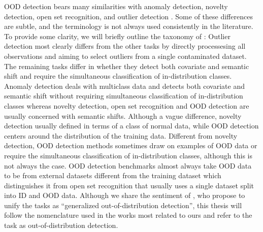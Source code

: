 OOD detection bears many similarities with anomaly detection, novelty detection, open set recognition, and outlier detection \cite{yang_generalized_2022}. 
Some of these differences are subtle, and the terminology is not always used consistently in the literature. To provide some clarity, we will briefly outline the taxonomy of \textcite{yang_generalized_2022}: 
Outlier detection most clearly differs from the other tasks by directly processesing all observations and aiming to select outliers from a single contaminated dataset. 
The remaining tasks differ in whether they detect both covariate and semantic shift and require the simultaneous classification of in-distribution classes. %
Anomaly detection deals with multiclass data and detects both covariate and semantic shift without requiring simultaneous classification of in-distribution classes whereas novelty detection, open set recognition and OOD detection are usually concerned with semantic shifts. 
Although a vague difference, novelty detection usually defined in terms of a class of normal data, while OOD detection centers around the distribution of the training data. Different from novelty detection, OOD detection methods sometimes draw on examples of OOD data or require the simultaneous classification of in-distribution classes, although this is not always the case. 
OOD detection benchmarks almost always take OOD data to be from external datasets different from the training dataset which distinguishes it from open set recognition that usually uses a single dataset split into ID and OOD data. 
Although we share the sentiment of \textcite{yang_generalized_2022}, who propose to unify the tasks as ``generalized out-of-distribution detection'', this thesis will follow the nomenclature used in the works most related to ours and refer to the task as out-of-distribution detection.


